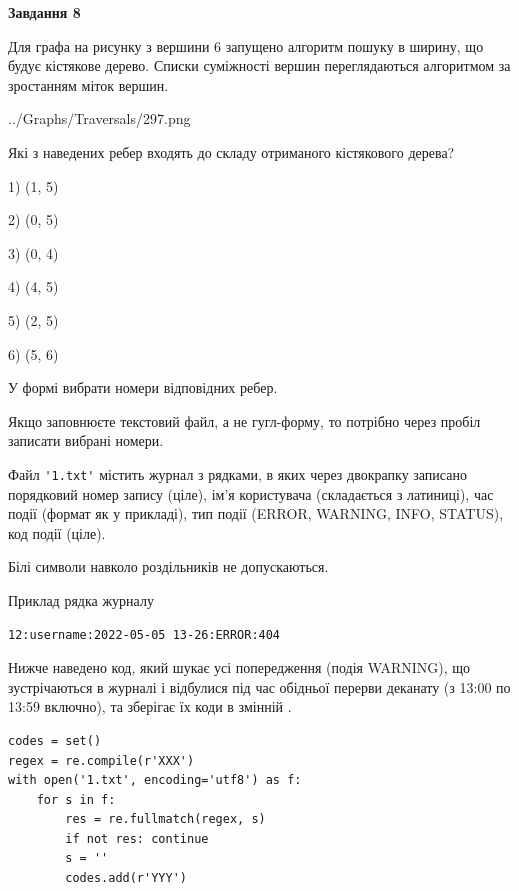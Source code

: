 \documentclass[12pt, ukrainian]{article}
\def\code#1{\Verb!#1!}
\begin{document}
{\begin {large}
{\begin {center}\textbf{Завдання 8}\end {center}}\par
Для графа на рисунку з вершини 6 запущено алгоритм пошуку в ширину, що будує кістякове дерево. Списки суміжності вершин переглядаються алгоритмом за зростанням міток вершин.\par
\begin{center}
	{../Graphs/Traversals/297.png}
\end{center}
\par Які з наведених ребер входять до складу отриманого кістякового дерева?\par
1) (1, 5)\par
2) (0, 5)\par
3) (0, 4)\par
4) (4, 5)\par
5) (2, 5)\par
6) (5, 6)\par
{\vskip 15pt} У формі вибрати номери відповідних ребер.


Якщо заповнюєте текстовий файл, а не гугл-форму, то потрібно через пробіл записа\-ти вибрані номери.\par
\newpage


Файл \code{'1.txt'} містить журнал з рядками, в яких через двокрапку записано поряд\-ко\-вий номер запису (ціле), ім'я користувача (складається з латиниці), час події (фор\-мат як у прикладі), тип події (ERROR, WARNING, INFO, STATUS), код події (ціле).

Білі символи навколо роздільників не допускаються.

Приклад рядка журналу



\begin{verbatim}
12:username:2022-05-05 13-26:ERROR:404
\end{verbatim}


Нижче наведено код, який шукає усі попередження (подія WARNING), що зустрі\-ча\-ються в журналі і відбулися під час обідньої перерви деканату (з 13:00 по 13:59 включно), та зберігає їх коди в змінній .



\begin{verbatim}
codes = set()
regex = re.compile(r'XXX')
with open('1.txt', encoding='utf8') as f:
    for s in f:
        res = re.fullmatch(regex, s)
        if not res: continue
        s = ''
        codes.add(r'YYY')
\end{verbatim}





\end{large}}
\end{document}
